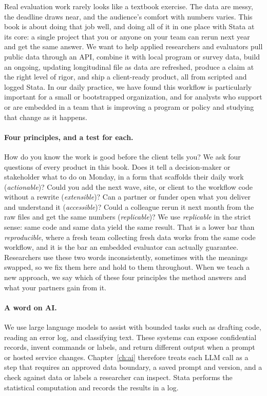 \documentclass[
    a4paper,
    fontsize=10pt,
    twoside=true,
    numbers=noenddot,
]{kaobook}
\begin{document}
Real evaluation work rarely looks like a textbook exercise. The data are messy, the deadline draws near, and the audience's comfort with numbers varies. This book is about doing that job well, and doing all of it in one place with Stata at its core: a single project that you or anyone on your team can rerun next year and get the same answer. We want to help applied researchers and evaluators pull public data through an API, combine it with local program or survey data, build an ongoing, updating longitudinal file as data are refreshed, produce a claim at the right level of rigor, and ship a client-ready product, all from scripted and logged Stata. In our daily practice, we have found this workflow is particularly important for a small or bootstrapped organization, and for analysts who support or are embedded in a team that is improving a program or policy and studying that change as it happens.


\paragraph{Four principles, and a test for each.} How do you know the work is good before the client tells you? We ask four questions of every product in this book. Does it tell a decision-maker or stakeholder what to do on Monday, in a form that scaffolds their daily work (\emph{actionable})? Could you add the next wave, site, or client to the workflow code without a rewrite (\emph{extensible})? Can a partner or funder open what you deliver and understand it (\emph{accessible})? Could a colleague rerun it next month from the raw files and get the same numbers (\emph{replicable})? We use \emph{replicable} in the strict sense: same code and same data yield the same result. That is a lower bar than \emph{reproducible}, where a fresh team collecting fresh data works from the same code workflow, and it is the bar an embedded evaluator can actually guarantee. Researchers use these two words inconsistently, sometimes with the meanings swapped, so we fix them here and hold to them throughout. When we teach a new approach, we say which of these four principles the method answers and what your partners gain from it.

\paragraph{A word on AI.} We use large language models to assist with bounded tasks such as drafting code, reading an error log, and classifying text. These systems can expose confidential records, invent commands or labels, and return different output when a prompt or hosted service changes. Chapter~\ref{ch:ai} therefore treats each LLM call as a step that requires an approved data boundary, a saved prompt and version, and a check against data or labels a researcher can inspect. Stata performs the statistical computation and records the results in a log.
\end{document}
